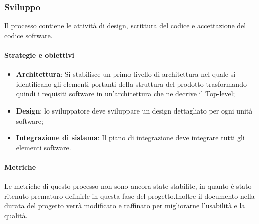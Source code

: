             \hphantom{}
            \def\productquality{
            {   Budget at Completion [BG],
                numero intero, 
                $ \pm 5 \% $ del preventivo,
                pari al preventivo
            },
            {   Earned value [EV],
                BAC - $\%$ di lavoro completato, 
                $ >0$,
                $ >0$
            },
            {   Planned value [PV],
                valore pianificato nel momento del calcolo, 
                $ >0$,
                $ >0$
            },
            {  Acual cost [AC],
               numero intero, 
                0 < AC $\leq$ budget totale,
                0 < AC $\leq$ PV
            },
            {   Schedule variance [SV],
               SV = EV - PV, 
                $ >0$,
                $ 0$
            },
            {    Cost variance [CV],
               CV = EV - AC, 
                $ >0$,
                $ \geq 0$
            },
        }
        

    \newpage  
    
    \subsubsection{Sviluppo}
    Il processo contiene le attività di design, scrittura del codice e accettazione del codice software.
    
        \paragraph{Strategie e obiettivi}
        \begin{itemize}
            \item \textbf{Architettura}: Si stabilisce un primo livello di architettura nel quale si identificano gli elementi portanti della struttura del prodotto trasformando quindi i requisiti software in un'architettura che ne decrive il Top-level;
            \item \textbf{Design}: lo sviluppatore deve sviluppare un design dettagliato per ogni unità software;
            \item \textbf{Integrazione di sistema}: Il piano di integrazione deve integrare tutti gli elementi software.
        \end{itemize}
        
        \paragraph{Metriche}
        Le metriche di questo processo non sono ancora state stabilite, in quanto è stato ritenuto prematuro definirle in questa fase del progetto.Inoltre il documento nella durata del progetto verrà modificato e raffinato per migliorarne l'usabilità e la qualità.
        
